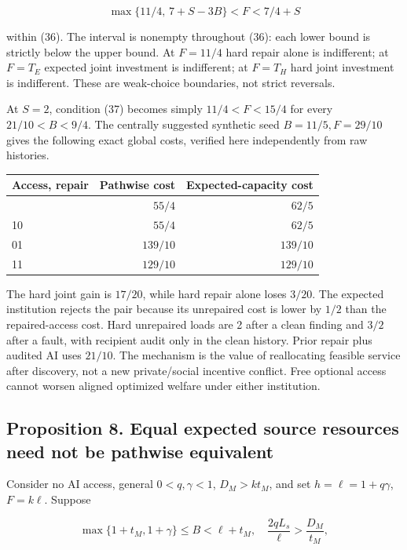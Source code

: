 \documentclass[
  11pt,
  a4paper,
]{article}
\begin{document}
\[\max\{11/4,\,7+S-3B\}<F<7/4+S \tag{37}\]

within (36). The interval is nonempty throughout (36): each lower bound
is strictly below the upper bound. At \(F=11/4\) hard repair alone is
indifferent; at \(F=T_E\) expected joint investment is indifferent; at
\(F=T_H\) hard joint investment is indifferent. These are weak-choice
boundaries, not strict reversals.

At \(S=2\), condition (37) becomes simply \(11/4<F<15/4\) for every
\(21/10<B<9/4\). The centrally suggested synthetic seed
\(B=11/5,F=29/10\) gives the following exact global costs, verified here
independently from raw histories.

\begin{longtable}[]{@{}lrr@{}}
\toprule\noalign{}
Access, repair & Pathwise cost & Expected-capacity cost \\
\midrule\noalign{}
\endhead
\bottomrule\noalign{}
\endlastfoot
00 & \(55/4\) & \(62/5\) \\
10 & \(55/4\) & \(62/5\) \\
01 & \(139/10\) & \(139/10\) \\
11 & \(129/10\) & \(129/10\) \\
\end{longtable}

The hard joint gain is \(17/20\), while hard repair alone loses
\(3/20\). The expected institution rejects the pair because its
unrepaired cost is lower by \(1/2\) than the repaired-access cost. Hard
unrepaired loads are 2 after a clean finding and \(3/2\) after a fault,
with recipient audit only in the clean history. Prior repair plus
audited AI uses \(21/10\). The mechanism is the value of reallocating
feasible service after discovery, not a new private/social incentive
conflict. Free optional access cannot worsen aligned optimized welfare
under either institution.

\hypertarget{proposition-8.-equal-expected-source-resources-need-not-be-pathwise-equivalent}{%
\subsection{Proposition 8. Equal expected source resources need not be
pathwise
equivalent}\label{proposition-8.-equal-expected-source-resources-need-not-be-pathwise-equivalent}}

Consider no AI access, general \(0<q,\gamma<1\), \(D_M>kt_M\), and set
\(h=\ell=1+q\gamma\), \(F=k\ell\). Suppose

\[\max\{1+t_M,1+\gamma\}\leq B<\ell+t_M,\quad
\frac{2qL_s}{\ell}>\frac{D_M}{t_M}, \tag{38}\]
\end{document}
